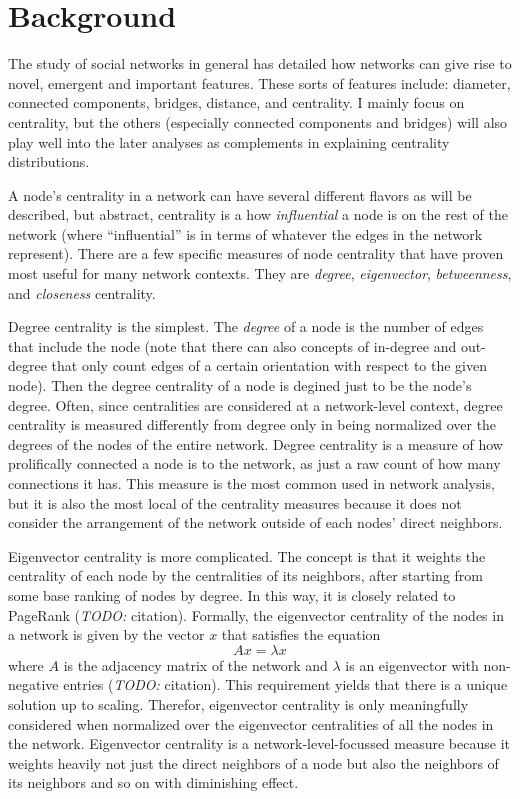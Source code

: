 \documentclass{article}
\newcommand{\todo}[1]{\textit{TODO:} #1}
\renewcommand{\it}{\textit}
\begin{document}
\section{Background}
\label{sec:background}

The study of social networks in general has detailed how networks can give rise to novel, emergent and important features.
These sorts of features include: diameter, connected components, bridges, distance, and centrality.
I mainly focus on centrality, but the others (especially connected components and bridges) will also play well into the later analyses as complements in explaining centrality distributions.

A node's centrality in a network can have several different flavors as will be described, but abstract, centrality is a how \it{influential} a node is on the rest of the network (where ``influential'' is in terms of whatever the edges in the network represent).
There are a few specific measures of node centrality that have proven most useful for many network contexts.
They are \it{degree}, \it{eigenvector}, \it{betweenness}, and \it{closeness} centrality.

Degree centrality is the simplest.
The \it{degree} of a node is the number of edges that include the node (note that there can also concepts of in-degree and out-degree that only count edges of a certain orientation with respect to the given node).
Then the degree centrality of a node is degined just to be the node's degree.
Often, since centralities are considered at a network-level context, degree centrality is measured differently from degree only in being normalized over the degrees of the nodes of the entire network.
Degree centrality is a measure of how prolifically connected a node is to the network, as just a raw count of how many connections it has.
This measure is the most common used in network analysis, but it is also the most local of the centrality measures because it does not consider the arrangement of the network outside of each nodes' direct neighbors.

Eigenvector centrality is more complicated.
The concept is that it weights the centrality of each node by the centralities of its neighbors, after starting from some base ranking of nodes by degree.
In this way, it is closely related to PageRank (\todo{citation}).
Formally, the eigenvector centrality of the nodes in a network is given by the vector $x$ that satisfies the equation $$ A x = \lambda x $$ where $A$ is the adjacency matrix of the network and $\lambda$ is an eigenvector with non-negative entries (\todo{citation}).
This requirement yields that there is a unique solution up to scaling. Therefor, eigenvector centrality is only meaningfully considered when normalized over the eigenvector centralities of all the nodes in the network.
Eigenvector centrality is a network-level-focussed measure because it weights heavily not just the direct neighbors of a node but also the neighbors of its neighbors and so on with diminishing effect.
\end{document}
